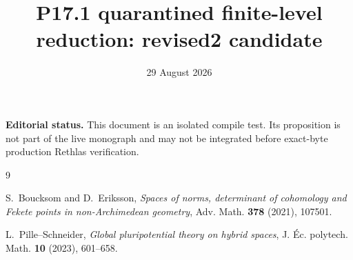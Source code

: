 \documentclass[11pt]{article}
\title{P17.1 quarantined finite-level reduction: revised2 candidate}
\author{}
\date{29 August 2026}
\theoremstyle{remark}
\begin{document}
\maketitle

\noindent
\textbf{Editorial status.}
This document is an isolated compile test. Its proposition is not part of
the live monograph and may not be integrated before exact-byte production
Rethlas verification.




\begin{thebibliography}{9}

S.~Boucksom and D.~Eriksson,
\emph{Spaces of norms, determinant of cohomology and Fekete points in
non-Archimedean geometry}, Adv. Math. \textbf{378} (2021), 107501.

L.~Pille--Schneider,
\emph{Global pluripotential theory on hybrid spaces},
J. \'{E}c. polytech. Math. \textbf{10} (2023), 601--658.

\end{thebibliography}
\end{document}

